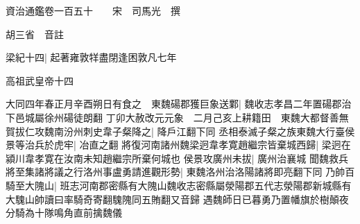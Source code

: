 






























































資治通鑑卷一百五十　　宋　司馬光　撰

胡三省　音註

梁紀十四|{
	起著雍敦䍧盡閉逢困敦凡七年}


高祖武皇帝十四

大同四年春正月辛酉朔日有食之　東魏碭郡獲巨象送鄴|{
	魏收志孝昌二年置碭郡治下邑城屬徐州碭徒朗翻}
丁卯大赦改元元象　二月己亥上耕籍田　東魏大都督善無賀拔仁攻魏南汾州刺史韋子粲降之|{
	降戶江翻下同}
丞相泰滅子粲之族東魏大行臺侯景等治兵於虎牢|{
	冶直之翻}
將復河南諸州魏梁迥韋孝寛趙繼宗皆棄城西歸|{
	梁迥在潁川韋孝寛在汝南未知趙繼宗所棄何城也}
侯景攻廣州未拔|{
	廣州治襄城}
聞魏救兵將至集諸將議之行洛州事盧勇請進觀形勢|{
	東魏洛州治洛陽諸將即亮翻下同}
乃帥百騎至大隗山|{
	班志河南郡密縣有大隗山魏收志密縣屬滎陽郡五代志滎陽郡新城縣有大騩山帥讀曰率騎奇寄翻騩隗同五賄翻又音歸}
遇魏師日已暮勇乃置幡旗於樹顛夜分騎為十隊鳴角直前擒魏儀

